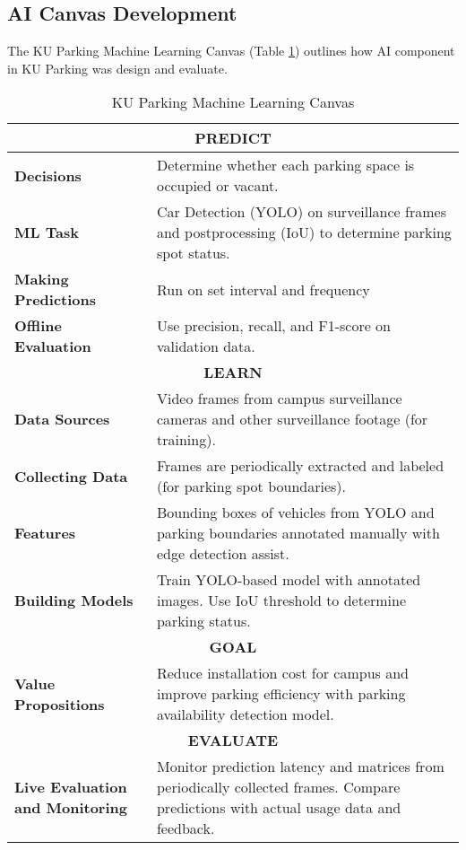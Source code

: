 \subsection{AI Canvas Development}
\label{subsection:ai-canvas-development}
The KU Parking Machine Learning Canvas (Table \ref{tab:ml-canvas}) outlines how AI component in KU Parking was design and evaluate.

\begin{table}[H]
\centering
\caption{KU Parking Machine Learning Canvas}
\label{tab:ml-canvas}
\begin{tabular}{|p{4cm}|p{10cm}|}
\hline
\multicolumn{2}{|c|}{\cellcolor{cyan!15}\textbf{PREDICT}} \\ \hline
\textbf{Decisions} & Determine whether each parking space is occupied or vacant.\\ \hline
\textbf{ML Task} & Car Detection (YOLO) on surveillance frames and postprocessing (IoU) to determine parking spot status.\\ \hline
\textbf{Making Predictions} & Run on set interval and frequency\\ \hline
\textbf{Offline Evaluation} & Use precision, recall, and F1-score on validation data. \\ \hline

\multicolumn{2}{|c|}{\cellcolor{yellow!15}\textbf{LEARN}} \\ \hline
\textbf{Data Sources} & Video frames from campus surveillance cameras and other surveillance footage (for training). \\ \hline
\textbf{Collecting Data} & Frames are periodically extracted and labeled (for parking spot boundaries). \\ \hline
\textbf{Features} & Bounding boxes of vehicles from YOLO and parking boundaries annotated manually with edge detection assist. \\ \hline
\textbf{Building Models} & Train YOLO-based model with annotated images. Use IoU threshold to determine parking status. \\ \hline

\multicolumn{2}{|c|}{\textbf{GOAL}} \\ \hline\textbf{Value Propositions} & Reduce installation cost for campus and improve parking efficiency with parking availability detection model. \\ \hline

\multicolumn{2}{|c|}{\cellcolor{purple!15}\textbf{EVALUATE}} \\ \hline
\textbf{Live Evaluation and Monitoring} & Monitor prediction latency and matrices from periodically collected frames. Compare predictions with actual usage data and feedback. \\ \hline

\end{tabular}
\end{table}

